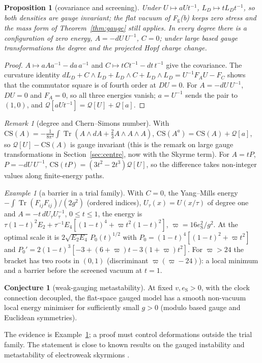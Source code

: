 \documentclass[aps,pra,onecolumn,superscriptaddress,nofootinbib,10pt]{revtex4-2}
\newtheorem{proposition}[theorem]{Proposition}
\theoremstyle{definition}
\newtheorem{conjecture}[theorem]{Conjecture}
\theoremstyle{remark}
\newtheorem{remark}[theorem]{Remark}
\newtheorem{example}[theorem]{Example}
\newcommand{\tr}{\operatorname{Tr}}
\begin{document}
\begin{proposition}[covariance and screening]\label{prop:skscreen}
Under $U\mapsto aUt^{-1}$, $L_D\mapsto tL_Dt^{-1}$, so both densities are gauge invariant; the flat vacuum of F$_{\mathrm g}$(b) keeps zero
stress and the mass form of Theorem~\ref{thm:gauge} still applies.  In every degree there is a configuration of
zero energy, $A=-dU\,U^{-1}$, $C=0$; under large based gauge transformations the degree and the projected Hopf
charge change.
\end{proposition}
\begin{proof}
$A\mapsto aAa^{-1}-da\,a^{-1}$ and $C\mapsto tCt^{-1}-dt\,t^{-1}$ give the covariance.  The curvature identity
$dL_D+C\wedge L_D+L_D\wedge C+L_D\wedge L_D=U^{-1}F_AU-F_C$ shows that the commutator square is of fourth order at $DU=0$.  For
$A=-dU\,U^{-1}$, $DU=0$ and $F_A=0$, so all three energies vanish; $a=U^{-1}$ sends the pair to $(1,0)$, and
$\mathcal Q[aUt^{-1}]=\mathcal Q[U]+\mathcal Q[a]$.
\end{proof}
\begin{remark}[degree and Chern--Simons number]\label{rem:skcs}
With $\mathrm{CS}(A)=-\frac1{8\pi^2}\int\tr(A\wedge dA+\tfrac23A\wedge A\wedge A)$, $\mathrm{CS}(A^a)=\mathrm{CS}(A)+\mathcal Q[a]$, so $\mathcal Q[U]-\mathrm{CS}(A)$ is gauge invariant
(this is the remark on large gauge transformations in Section~\ref{sec:centre}, now with the Skyrme term).  For
$A=tP$, $P=-dU\,U^{-1}$, $\mathrm{CS}(tP)=(3t^2-2t^3)\mathcal Q[U]$, so the difference takes non-integer values along finite-energy
paths.
\end{remark}
\begin{example}[a barrier in a trial family]\label{ex:skbarrier}
With $C=0$, the Yang--Mills energy $-\int\tr(F_{ij}F_{ij})/(2g^2)$ (ordered indices), $U_\tau(x)=U(x/\tau)$ of degree one and
$A=-t\,dU_\tau U_\tau^{-1}$, $0\le t\le1$, the energy is $\tau(1-t)^2E_2+\tau^{-1}E_4[(1-t)^4+\varpi t^2(1-t)^2]$, $\varpi=16e_{\mathrm S}^2/g^2$.  At the
optimal scale it is $2\sqrt{E_2E_4}\,P_0(t)^{1/2}$ with $P_0=(1-t)^4[(1-t)^2+\varpi t^2]$ and
$P_0'=2(1-t)^3[-3+(6+\varpi)t-3(1+\varpi)t^2]$.  For $\varpi>24$ the bracket has two roots in $(0,1)$ (discriminant
$\varpi(\varpi-24)$): a local minimum and a barrier before the screened vacuum at $t=1$.
\end{example}
\begin{conjecture}[weak-gauging metastability]\label{conj:metastable}
At fixed $v,e_{\mathrm S}>0$, with the clock connection decoupled, the flat-space gauged model has a smooth non-vacuum
local energy minimiser for sufficiently small $g>0$ (modulo based gauge and Euclidean symmetries).
\end{conjecture}
\noindent The evidence is Example~\ref{ex:skbarrier}; a proof must control deformations outside the trial family.  The
statement is close to known results on the gauged instability and metastability of electroweak skyrmions
\cite{rf:GipsonTze1981,rf:AmbjornRubakov1985}.
\end{document}
